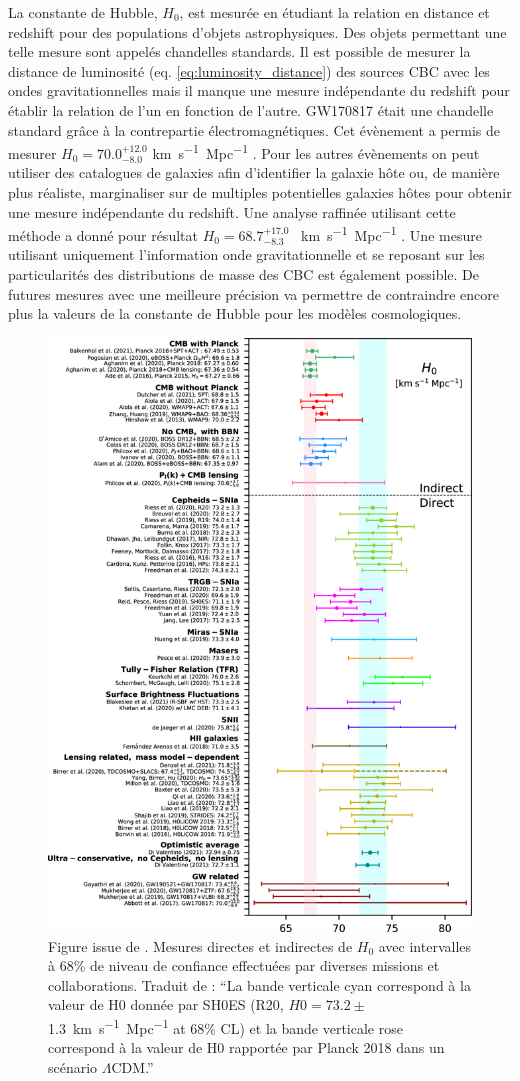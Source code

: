 La constante de Hubble, $H_0$, est mesurée en étudiant la relation en distance et redshift pour des populations d'objets astrophysiques.
Des objets permettant une telle mesure sont appelés chandelles standards.
Il est possible de mesurer la distance de luminosité (eq. \ref{eq:luminosity_distance}) des sources CBC avec les ondes gravitationnelles mais il manque une mesure indépendante du redshift pour établir la relation de l'un en fonction de l'autre.
GW170817 était une chandelle standard grâce à la contrepartie électromagnétiques.
Cet évènement a permis de mesurer $H_0 = 70.0^{+12.0}_{-8.0}$ \si{km.s^{-1}.Mpc^{-1}} \cite{H0_gw170817}.
Pour les autres évènements on peut utiliser des catalogues de galaxies afin d'identifier la galaxie hôte ou, de manière plus réaliste, marginaliser sur de multiples potentielles galaxies hôtes pour obtenir une mesure indépendante du redshift.
Une analyse raffinée utilisant cette méthode a donné pour résultat $H_0 = 68.7^{+17.0}_{-8.3}$ \SI{}{km.s^{-1}.Mpc^{-1}} \cite{H0_LVK}.
Une mesure utilisant uniquement l'information onde gravitationnelle et se reposant sur les particularités des distributions de masse des CBC est également possible.
De futures mesures avec une meilleure précision va permettre de contraindre encore plus la valeurs de la constante de Hubble pour les modèles cosmologiques.
%
\begin{figure}
  \centering
  \includegraphics[width=0.7\linewidth]{sectionGW/measurementH0.jpg}
  \caption{Figure issue de \cite{H0_1}. Mesures directes et indirectes de $H_0$ avec intervalles à 68\% de niveau de confiance effectuées par diverses missions et collaborations. Traduit de \cite{H0_1}: ``La bande verticale cyan correspond à la valeur de H0 donnée par SH0ES \cite{shoes} (R20, $H0 = 73.2 \pm$ \SI{1.3}{km.s^{-1}.Mpc^{-1}} at 68\% CL) et la bande verticale rose correspond à la valeur de H0 rapportée par Planck 2018 \cite{Planck_2018} dans un scénario $\Lambda$CDM.''}
  \label{fig:H0}
\end{figure}
%

